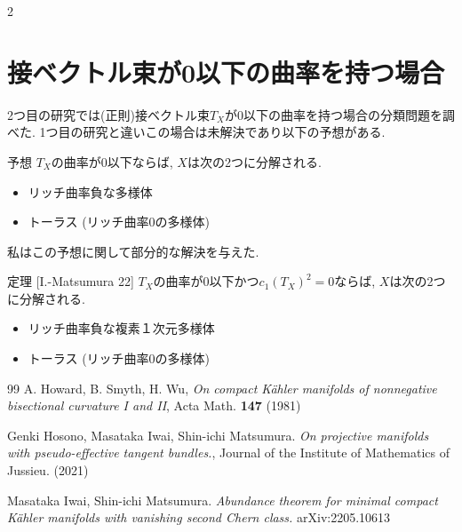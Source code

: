 \documentclass{jsarticle}
\theoremstyle{upshapetheorem}
\begin{document}
\begin{multicols}{2}

\section{接ベクトル束が0以下の曲率を持つ場合}

2つ目の研究では(正則)接ベクトル束$T_X$が0以下の曲率を持つ場合の分類問題を調べた.
1つ目の研究と違いこの場合は未解決であり以下の予想がある. 

\begin{itembox}[l]{予想}
$T_X$の曲率が0以下ならば,  $X$は次の2つに分解される.
\begin{itemize}
 \setlength{\parskip}{0cm}
  \setlength{\itemsep}{0pt}
\item リッチ曲率負な多様体
\item トーラス (リッチ曲率0の多様体)
\end{itemize}
\end{itembox}

私はこの予想に関して部分的な解決を与えた.

\begin{itembox}[l]{定理 [I.-Matsumura 22]}
$T_X$の曲率が0以下かつ$c_1(T_X)^2=0$ならば,  $X$は次の2つに分解される.
\begin{itemize}
 \setlength{\parskip}{0cm}
  \setlength{\itemsep}{0pt}
\item リッチ曲率負な複素１次元多様体
\item トーラス (リッチ曲率0の多様体)
\end{itemize}
\end{itembox}


\footnotesize
\begin{thebibliography}{99}
A. Howard, B. Smyth, H. Wu, 
\textit{On compact K\"ahler manifolds of nonnegative bisectional curvature I and II}, 
Acta Math. {\bf{147}} (1981) %

Genki Hosono, Masataka Iwai, Shin-ichi Matsumura. 
\textit{On projective manifolds with pseudo-effective tangent bundles.}, 
Journal of the Institute of Mathematics of Jussieu. (2021) 

Masataka Iwai, Shin-ichi Matsumura.
 \textit{Abundance theorem for minimal compact K\"ahler manifolds with vanishing second Chern class.} arXiv:2205.10613

\end{thebibliography}

\end{multicols}
\end{document}
